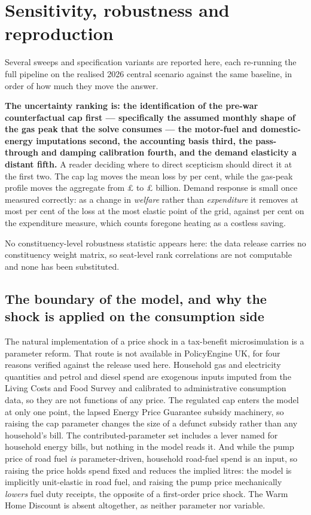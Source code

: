 \appendix
\section{Sensitivity, robustness and reproduction}
\label{sec:appendix}

Several sweeps and specification variants are reported here, each re-running the full pipeline on the realised 2026 central scenario against the same baseline, in order of how much they move the answer.

\textbf{The uncertainty ranking is: the identification of the pre-war counterfactual cap first --- specifically the assumed monthly shape of the gas peak that the solve consumes --- the motor-fuel and domestic-energy imputations second, the accounting basis third, the pass-through and damping calibration fourth, and the demand elasticity a distant fifth.} A reader deciding where to direct scepticism should direct it at the first two. The cap lag moves the mean loss by \genCapLagSpreadPct{} per cent, while the gas-peak profile moves the aggregate from \pounds \genGasProfileAggMinBn{} to \pounds \genGasProfileAggMaxBn{} billion. Demand response is small once measured correctly: as a change in \emph{welfare} rather than \emph{expenditure} it removes at most \genWelfareShavedHighEpsPct{} per cent of the loss at the most elastic point of the grid, against \genSpendShavedHighEpsPct{} per cent on the expenditure measure, which counts foregone heating as a costless saving.

No constituency-level robustness statistic appears here: the data release carries no constituency weight matrix, so seat-level rank correlations are not computable and none has been substituted.

\subsection{The boundary of the model, and why the shock is applied on the consumption side}
\label{app:modelboundary}

The natural implementation of a price shock in a tax-benefit microsimulation is a parameter reform. That route is not available in PolicyEngine UK, for four reasons verified against the release used here. Household gas and electricity quantities and petrol and diesel spend are exogenous inputs imputed from the Living Costs and Food Survey and calibrated to administrative consumption data, so they are not functions of any price. The regulated cap enters the model at only one point, the lapsed Energy Price Guarantee subsidy machinery, so raising the cap parameter changes the size of a defunct subsidy rather than any household's bill. The contributed-parameter set includes a lever named for household energy bills, but nothing in the model reads it. And while the pump price of road fuel \emph{is} parameter-driven, household road-fuel spend is an input, so raising the price holds spend fixed and reduces the implied litres: the model is implicitly unit-elastic in road fuel, and raising the pump price mechanically \emph{lowers} fuel duty receipts, the opposite of a first-order price shock. The Warm Home Discount is absent altogether, as neither parameter nor variable.

